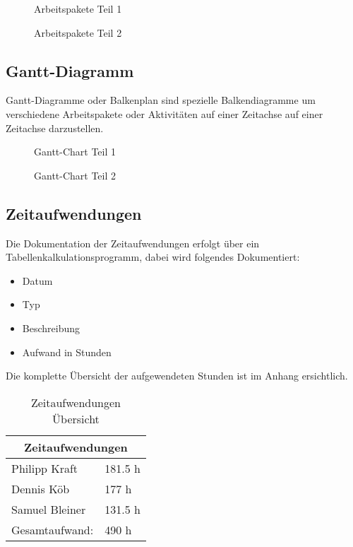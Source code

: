 \begin{figure}[H]
  \centering
  \caption{Arbeitspakete Teil 1}
\end{figure}

\begin{figure}[H]
  \centering
  \caption{Arbeitspakete Teil 2}
\end{figure}

\subsection{Gantt-Diagramm}
Gantt-Diagramme oder Balkenplan sind spezielle Balkendiagramme um verschiedene
Arbeitspakete oder Aktivitäten auf einer Zeitachse auf einer Zeitachse
darzustellen.

\clearpage \newpage
\begin{sidewaysfigure}[htbp]
  \centering
  \caption{Gantt-Chart Teil 1}
\end{sidewaysfigure}

\begin{sidewaysfigure}[htbp]
  \centering
  \caption{Gantt-Chart Teil 2}
\end{sidewaysfigure}
\clearpage

\subsection{Zeitaufwendungen}

Die Dokumentation der Zeitaufwendungen erfolgt über ein
Tabellenkalkulationsprogramm, dabei wird folgendes Dokumentiert:

\begin{itemize}
  \item Datum
  \item Typ
  \item Beschreibung
  \item Aufwand in Stunden
\end{itemize}

Die komplette Übersicht der aufgewendeten Stunden ist im Anhang ersichtlich.

\begin{table}[H]
  \centering
  \begin{tabular}{@{}ll@{}}
  \toprule
  \multicolumn{2}{c}{\textbf{Zeitaufwendungen}} \\ \midrule
  Philipp Kraft             & 181.5 h           \\
  Dennis Köb                & 177 h             \\
  Samuel Bleiner            & 131.5 h           \\ \midrule
  Gesamtaufwand:            & 490 h             \\ \bottomrule
  \end{tabular}
  \caption{Zeitaufwendungen Übersicht}
\end{table}